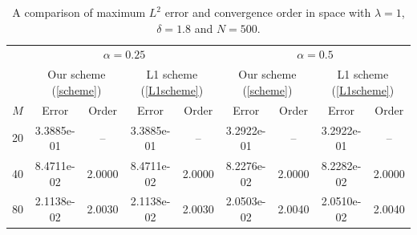 \documentclass[10pt, reqno]{amsart}
\theoremstyle{remark}
\theoremstyle{definition}
\numberwithin{table}{section}
\begin{document}
\begin{table}[htbp]
\centering
\setlength{\tabcolsep}{5pt}   %
\caption{A comparison of  maximum $L^2$ error and convergence order in space with $\lambda=1$, $\delta=1.8$ and $N=500$.}
\label{table:errors1s}
\begin{tabular}{c c c c c c c c c}
\toprule
& \multicolumn{4}{c}{$\alpha=0.25$} 
& \multicolumn{4}{c}{$\alpha=0.5$} \\
\cmidrule(lr){2-5} \cmidrule(lr){6-9}
 & \multicolumn{2}{c}{Our scheme (\ref{scheme})} & \multicolumn{2}{c}{L1 scheme (\ref{L1scheme})}   & \multicolumn{2}{c}{Our scheme (\ref{scheme})} & \multicolumn{2}{c}{L1 scheme (\ref{L1scheme})} \\
\cmidrule(lr){2-3} \cmidrule(lr){4-5} \cmidrule(lr){6-7} \cmidrule(lr){8-9}
\multirow{1}{*}{$M$} & Error & Order & Error & Order & Error & Order & Error & Order \\
\midrule
20
& 3.3885e-01 & -- 
& 3.3885e-01 & -- 
& 3.2922e-01 & -- 
& 3.2922e-01 & -- \\
40
& 8.4711e-02 & 2.0000 
& 8.4711e-02 & 2.0000 
& 8.2276e-02 & 2.0000 
& 8.2282e-02 & 2.0000 \\
80
& 2.1138e-02 & 2.0030 
& 2.1138e-02 & 2.0030 
& 2.0503e-02 & 2.0040 
& 2.0510e-02 & 2.0040 \\
\bottomrule
\end{tabular}
\end{table}
\end{document}
